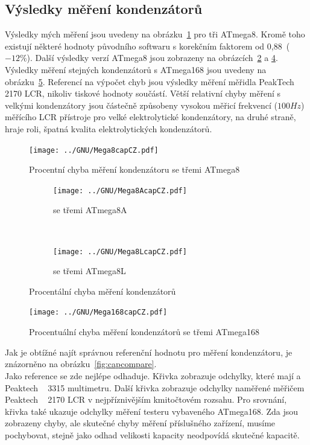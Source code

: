 \subsection{Výsledky měření kondenzátorů}
Výsledky mých měření jsou uvedeny na obrázku~\ref{fig:mega8cap} pro tři ATmega8.
Kromě toho existují některé hodnoty původního softwaru s korekčním faktorem
od 0,88~(\(-12\%\)).
Další výsledky verzí ATmega8 jsou zobrazeny na obrázcích~\ref{fig:mega8Acap} a \ref{fig:mega8Lcap}.
Výsledky měření stejných kondenzátorů s ATmega168 jsou uvedeny na obrázku~\ref{fig:mega168cap}.
Referencí na výpočet chyb jsou výsledky měření měřidla PeakTech 2170 LCR, nikoliv tiskové hodnoty součástí.
Větší relativní chyby měření s velkými kondenzátory jsou částečně způsobeny vysokou měřicí
frekvencí (\(100Hz\)) měřícího  LCR přístroje pro velké elektrolytické kondenzátory,
na druhé straně, hraje  roli, špatná kvalita elektrolytických kondenzátorů.

\begin{figure}[H]
\centering
\texttt{[image: ../GNU/Mega8capCZ.pdf]}
\caption{Procentní chyba měření kondenzátoru se třemi ATmega8}
\label{fig:mega8cap}
\end{figure}

\begin{figure}[H]
  \begin{subfigure}[b]{.5\textwidth}
    \centering
    \texttt{[image: ../GNU/Mega8AcapCZ.pdf]}
    \caption{se třemi ATmega8A}
    \label{fig:mega8Acap}
  \end{subfigure}
  ~
  \begin{subfigure}[b]{.5\textwidth}
    \centering
    \texttt{[image: ../GNU/Mega8LcapCZ.pdf]}
    \caption{se třemi ATmega8L}
    \label{fig:mega8Lcap}
  \end{subfigure}
  \caption{Procentální chyba měření kondenzátorů}
\end{figure}

\begin{figure}[H]
\centering
\texttt{[image: ../GNU/Mega168capCZ.pdf]}
\caption{Procentuální chyba měření kondenzátorů se třemi ATmega168}
\label{fig:mega168cap}
\end{figure}

Jak je obtížné najít správnou referenční hodnotu pro měření kondenzátoru,
je znázorněno na obrázku~\ref{fig:capcompare}.\\
Jako reference se zde nejlépe odhaduje. Křivka  zobrazuje odchylky,
které mají a Peaktech ~ 3315 multimetru.
Další křivka  zobrazuje odchylky naměřené měřičem Peaktech ~ 2170 LCR v nejpříznivějším
kmitočtovém rozsahu.
Pro srovnání, křivka  také ukazuje odchylky měření testeru vybaveného ATmega168.
Zda jsou zobrazeny chyby, ale skutečné chyby měření příslušného zařízení, musíme pochybovat, stejně jako
odhad velikosti kapacity neodpovídá skutečné kapacitě.

